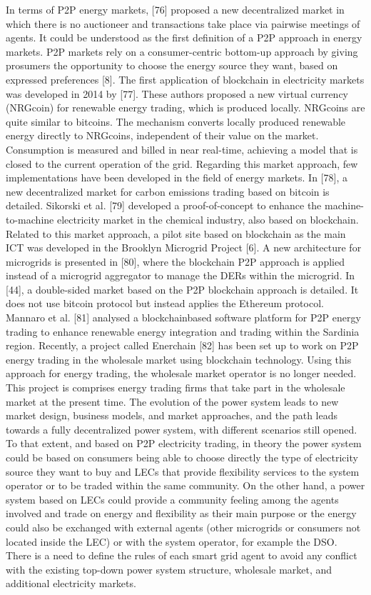 In terms of P2P energy markets, [76] proposed a new decentralized market in which there is no auctioneer and transactions take place via pairwise meetings of agents. It could be understood as the first definition of a P2P approach in energy markets. P2P markets rely on a consumer-centric bottom-up approach by giving prosumers the opportunity to choose the energy source they want, based on expressed preferences [8]. The first application of blockchain in electricity markets was developed in 2014 by [77]. These authors proposed a new virtual currency (NRGcoin) for renewable energy trading, which is produced locally. NRGcoins are quite similar to bitcoins. The mechanism converts locally produced renewable energy directly to NRGcoins, independent of their value on the market. Consumption is measured and billed in near real-time, achieving a model that is closed to the current operation of the grid.
Regarding this market approach, few implementations have been developed in the field of energy markets. In [78], a new decentralized market for carbon emissions trading based on bitcoin is detailed. Sikorski et al. [79] developed a proof-of-concept to enhance the machine-to-machine electricity market in the chemical industry, also based on blockchain. Related to this market approach, a pilot site based on blockchain as the main ICT was developed in the Brooklyn Microgrid Project [6]. A new architecture for microgrids is presented in [80], where the blockchain P2P approach is applied instead of a microgrid aggregator to manage the DERs within the microgrid. In [44], a double-sided market based on the P2P blockchain approach is detailed. It does not use bitcoin protocol but instead applies the Ethereum protocol. Mannaro et al. [81] analysed a blockchainbased software platform for P2P energy trading to enhance renewable energy integration and trading within the Sardinia region. Recently, a project called Enerchain [82] has been set up to work on P2P energy trading in the wholesale market using blockchain technology. Using this approach for energy trading, the wholesale market operator is no longer needed. This project is comprises energy trading firms that take part in the wholesale market at the present time. The evolution of the power system leads to new market design, business models, and market approaches, and the path leads towards a fully decentralized power system, with different scenarios still opened. To that extent, and based on P2P electricity trading, in theory the power system could be based on consumers being able to choose directly the type of electricity source they want to buy and LECs that provide flexibility services to the system operator or to be traded within the same community. On the other hand, a power system based on LECs could provide a community feeling among the agents involved and trade on energy and flexibility as their main purpose or the energy could also be exchanged with external agents (other microgrids or consumers not located inside the LEC) or with the system operator, for example the DSO. There is a need to define the rules of each smart grid agent to avoid any conflict with the existing top-down power system structure, wholesale market, and additional electricity markets.


